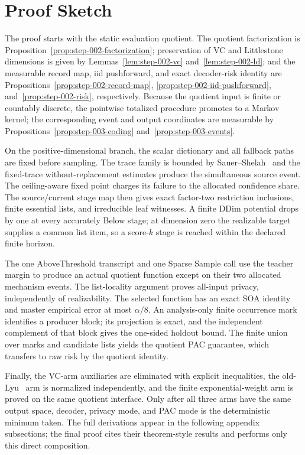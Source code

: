 \section{Proof Sketch}

The proof starts with the static evaluation quotient.  The quotient
factorization is Proposition~\ref{prop:step-002-factorization}; preservation
of VC and Littlestone dimensions is given by
Lemmas~\ref{lem:step-002-vc} and~\ref{lem:step-002-ld}; and the measurable
record map, iid pushforward, and exact decoder-risk identity are
Propositions~\ref{prop:step-002-record-map},
\ref{prop:step-002-iid-pushforward}, and~\ref{prop:step-002-risk},
respectively.
Because the quotient input is finite or countably discrete, the pointwise
totalized procedure promotes to a Markov kernel; the corresponding event and
output coordinates are measurable by Propositions~\ref{prop:step-003-coding}
and~\ref{prop:step-003-events}.

On the positive-dimensional branch, the scalar dictionary and all fallback
paths are fixed before sampling.  The trace family is bounded by
Sauer--Shelah~\citep{sauer1972}
and the fixed-trace without-replacement estimates produce the simultaneous
source event.  The ceiling-aware fixed point charges its failure to the
allocated confidence share.  The source/current stage map then gives exact
factor-two restriction inclusions, finite essential lists, and irreducible
leaf witnesses.  A finite DDim potential drops by one at every accurately
Below stage; at dimension zero the realizable target supplies a common list
item, so a score-$k$ stage is reached within the declared finite horizon.

The one AboveThreshold transcript and one Sparse Sample call use the teacher
margin to produce an actual quotient function except on their two allocated
mechanism events.  The list-locality argument proves all-input privacy,
independently of realizability.  The selected function has an exact SOA
identity and master empirical error at most $\alpha/8$.  An analysis-only
finite occurrence mark identifies a producer block; its projection is exact,
and the independent complement of that block gives the one-sided holdout
bound.  The finite union over marks and candidate lists yields the quotient
PAC guarantee, which transfers to raw risk by the quotient identity.

Finally, the VC-arm auxiliaries are eliminated with explicit inequalities,
the old-Lyu~\citep{lyu2025} arm is normalized independently, and the finite exponential-weight
arm is proved on the same quotient interface.  Only after all three arms have
the same output space, decoder, privacy mode, and PAC mode is the deterministic
minimum taken.  The full derivations appear in the following appendix
subsections; the final proof cites their theorem-style results and performs
only this direct composition.

